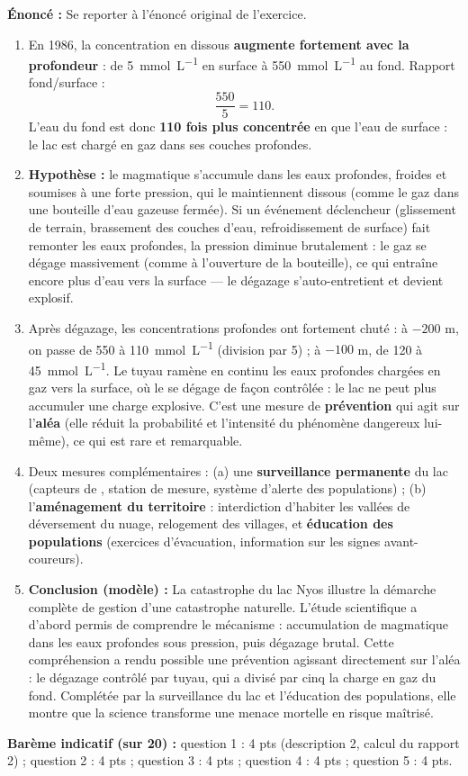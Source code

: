 \documentclass[11pt]{article}
\begin{document}
\begin{corrige}
\textbf{Énoncé :} Se reporter à l'énoncé original de l'exercice.
\tcblower
\begin{enumerate}
\item En 1986, la concentration en  dissous \textbf{augmente fortement avec la profondeur} : de \SI{5}{mmol.L^{-1}} en surface à \SI{550}{mmol.L^{-1}} au fond. Rapport fond/surface :
\[ \frac{550}{5} = 110. \]
L'eau du fond est donc \textbf{110 fois plus concentrée} en  que l'eau de surface : le lac est chargé en gaz dans ses couches profondes.
\item \textbf{Hypothèse :} le  magmatique s'accumule dans les eaux profondes, froides et soumises à une forte pression, qui le maintiennent dissous (comme le gaz dans une bouteille d'eau gazeuse fermée). Si un événement déclencheur (glissement de terrain, brassement des couches d'eau, refroidissement de surface) fait remonter les eaux profondes, la pression diminue brutalement : le gaz se dégage massivement (comme à l'ouverture de la bouteille), ce qui entraîne encore plus d'eau vers la surface — le dégazage s'auto-entretient et devient explosif.
\item Après dégazage, les concentrations profondes ont fortement chuté : à $-200$ m, on passe de 550 à \SI{110}{mmol.L^{-1}} (division par 5) ; à $-100$ m, de 120 à \SI{45}{mmol.L^{-1}}. Le tuyau ramène en continu les eaux profondes chargées en gaz vers la surface, où le  se dégage de façon contrôlée : le lac ne peut plus accumuler une charge explosive. C'est une mesure de \textbf{prévention} qui agit sur l'\textbf{aléa} (elle réduit la probabilité et l'intensité du phénomène dangereux lui-même), ce qui est rare et remarquable.
\item Deux mesures complémentaires : (a) une \textbf{surveillance permanente} du lac (capteurs de , station de mesure, système d'alerte des populations) ; (b) l'\textbf{aménagement du territoire} : interdiction d'habiter les vallées de déversement du nuage, relogement des villages, et \textbf{éducation des populations} (exercices d'évacuation, information sur les signes avant-coureurs).
\item \textbf{Conclusion (modèle) :} La catastrophe du lac Nyos illustre la démarche complète de gestion d'une catastrophe naturelle. L'étude scientifique a d'abord permis de comprendre le mécanisme : accumulation de  magmatique dans les eaux profondes sous pression, puis dégazage brutal. Cette compréhension a rendu possible une prévention agissant directement sur l'aléa : le dégazage contrôlé par tuyau, qui a divisé par cinq la charge en gaz du fond. Complétée par la surveillance du lac et l'éducation des populations, elle montre que la science transforme une menace mortelle en risque maîtrisé.
\end{enumerate}
\textbf{Barème indicatif (sur 20) :} question 1 : 4 pts (description 2, calcul du rapport 2) ; question 2 : 4 pts ; question 3 : 4 pts ; question 4 : 4 pts ; question 5 : 4 pts.


\end{corrige}
\end{document}
